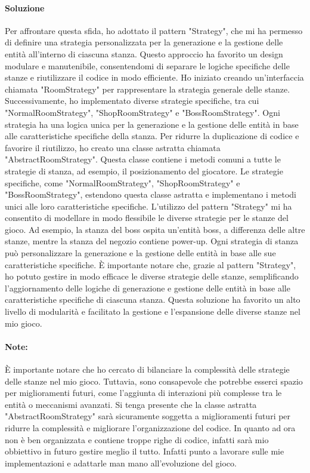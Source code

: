 \documentclass[a4paper,12pt]{report}
\begin{document}
\paragraph*{Soluzione}
Per affrontare questa sfida, ho adottato il pattern "Strategy", che mi ha permesso di definire una strategia personalizzata per la generazione e la gestione delle entità all'interno di ciascuna stanza.
Questo approccio ha favorito un design modulare e manutenibile, consentendomi di separare le logiche specifiche delle stanze e riutilizzare il codice in modo efficiente.
Ho iniziato creando un'interfaccia chiamata "RoomStrategy" per rappresentare la strategia generale delle stanze. 
Successivamente, ho implementato diverse strategie specifiche, tra cui "NormalRoomStrategy", "ShopRoomStrategy" e "BossRoomStrategy".
Ogni strategia ha una logica unica per la generazione e la gestione delle entità in base alle caratteristiche specifiche della stanza.
Per ridurre la duplicazione di codice e favorire il riutilizzo, ho creato una classe astratta chiamata "AbstractRoomStrategy".
Questa classe contiene i metodi comuni a tutte le strategie di stanza, ad esempio, il posizionamento del giocatore.
Le strategie specifiche, come "NormalRoomStrategy", "ShopRoomStrategy" e "BossRoomStrategy", estendono questa classe astratta e implementano i metodi unici alle loro caratteristiche specifiche.
L'utilizzo del pattern "Strategy" mi ha consentito di modellare in modo flessibile le diverse strategie per le stanze del gioco. 
Ad esempio, la stanza del boss ospita un'entità boss, a differenza delle altre stanze, mentre la stanza del negozio contiene power-up.
Ogni strategia di stanza può personalizzare la generazione e la gestione delle entità in base alle sue caratteristiche specifiche.
È importante notare che, grazie al pattern "Strategy", ho potuto gestire in modo efficace le diverse strategie delle stanze, semplificando l'aggiornamento delle logiche di generazione e gestione delle entità in base alle caratteristiche specifiche di ciascuna stanza.
Questa soluzione ha favorito un alto livello di modularità e facilitato la gestione e l'espansione delle diverse stanze nel mio gioco.
\paragraph*{Note:}
È importante notare che ho cercato di bilanciare la complessità delle strategie delle stanze nel mio gioco. 
Tuttavia, sono consapevole che potrebbe esserci spazio per miglioramenti futuri, come l'aggiunta di interazioni più complesse tra le entità o meccanismi avanzati.
Si tenga presente che la classe astratta "AbstractRoomStrategy" sarà sicuramente soggetta a miglioramenti futuri per ridurre la complessità e migliorare l'organizzazione del codice.
In quanto ad ora non è ben organizzata e contiene troppe righe di codice, infatti sarà mio obbiettivo in futuro gestire meglio il tutto.
Infatti punto a lavorare sulle mie implementazioni e adattarle man mano all'evoluzione del gioco.
\end{document}
